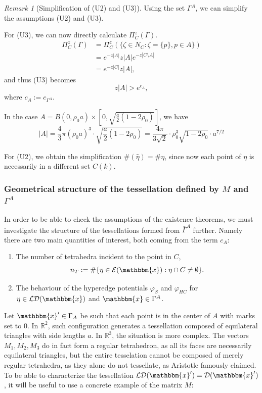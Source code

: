 \documentclass[12pt,a4paper]{article}
\newcommand{\R}{{\mathbb R^3}}
\theoremstyle{definition}
\theoremstyle{remark}
\newtheorem{remark}{Remark}
\theoremstyle{theorem}
\newcommand{\x}{\mathbbm{x}}
\begin{document}
\begin{remark}[Simplification of (U2) and (U3)]\label{r:UA}
	Using the set $\Gamma^A$, we can simplify the assumptions (U2) and (U3).
	
	For (U3), we can now directly calculate $\Pi^z_C(\Gamma)$.
	\begin{align*} 
		\Pi^z_C(\Gamma) &= \Pi^z_C(\{\zeta \in N_C: \zeta = \{p\}, p \in A\}) \\
		& = e^{-z|A|} z |A| e^{-z|C\setminus A|} \\
		& = e^{-z|C|} z |A|,
	\end{align*}
	and thus (U3) becomes
	$$z|A| > e^{c_{A}},$$
	where $c_A := c_{\Gamma^A}$.

	In the case $A = B(0,\rho_0 a)\times [0, \sqrt{\frac a2(1-2\rho_0)}]$, we have
	$$|A| = \frac 43 \pi (\rho_0 a)^3 \cdot \sqrt{\frac a2(1-2\rho_0)} = \frac {4\pi}{3\sqrt{2}}\cdot  \rho_0^3 \sqrt{1-2\rho_0} \cdot a^{7/2}$$

	For (U2), we obtain the simplification $\#(\hat\eta) = \#\eta$, since now each point of $\eta$ is necessarily in a different set $C(k)$.
\end{remark}



\subsubsection{Geometrical structure of the tessellation defined by $M$ and $\Gamma^A$}
In order to be able to check the assumptions of the existence theorems, we must investigate the structure of the tessellations formed from $\bar\Gamma^A$ further. Namely there are two main quantities of interest, both coming from the term $c_A$:
\begin{enumerate}
	\item The number of tetrahedra incident to the point in $C$,  
		$$n_T := \# \{\eta \in \mathcal E(\x): \eta \cap C \neq \emptyset\}.$$
	\item The behaviour of the hyperedge potentials $\varphi_{S}$ and $\varphi_{HC}$ for $\eta \in \mathcal {LD}(\x)$ and $\x \in \Gamma^A$.
\end{enumerate}

Let $\x' \in \Gamma_A$ be such that each point is in the center of $A$ with marks set to $0$. In $\mathbb R^2$, such configuration generates a tessellation composed of equilateral triangles with side lengths $a$. In $\R$, the situation is more complex. The vectors $M_1,M_2,M_3$ do in fact form a regular tetrahedron, as all its faces are necessarily equilateral triangles, but the entire tesselation cannot be composed of merely regular tetrahedra, as they alone do not tessellate, as Aristotle famously claimed\cite{Lagarias12}. To be able to characterize the tessellation $\mathcal {LD}(\x')=\mathcal D(\x')$, it will be useful to use a concrete example of the matrix $M$:
\end{document}
